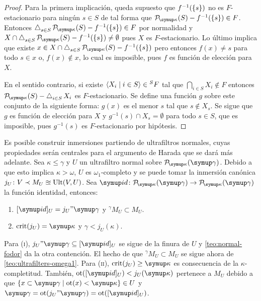 \documentclass
[
  12pt,
  letterpaper,
  openany,
  oneside,
]{book}
\begin{document}
\begin{proof}
    Para la primera implicación, queda supuesto que $f^{-1}(\left\{ s \right\})$ no es $F$-estacionario
    para ningún $s\in S$ de tal forma que $\pwset[\kappa]{S}-f^{-1}(\set{s}) \in F$.
    Entonces $\dint_{s\in S}\pwset[\kappa]{S}-f^{-1}(\set{s})\in F$ por normalidad
    y $X\cap \dint_{s\in S}\pwset[\kappa]{S}-f^{-1}(\set{s})\neq\emptyset$
    pues $X$ es $F$-estacionario. Lo último implica que existe
    $x\in X\cap \dint_{s\in S}\pwset[\kappa]{S}-f^{-1}(\set{s})$
    pero entonces $f(x)\neq s$ para todo $s\in x$ o,
    $f(x)\notin x$, lo cual es imposible, pues $f$ es función de elección para $X$.

    En el sentido contrario, si existe $\langle X_i\mid i\in S \rangle\in {}^SF$ tal que
    $\dint_{i\in S} X_i \notin F$ entonces $\pwset[\kappa]{S} - \dint_{i\in S} X_i$
    es $F$-estacionario. Se define una función $g$ sobre este conjunto de la siguiente
    forma: $g(x)$ es el menor $s$ tal que $s\notin X_s$. Se sigue que $g$ es función
    de elección para $X$ y $g^{-1}({s})\cap X_s=\emptyset$ para todo $s\in S$, que es
    imposible, pues $g^{-1}({s})$ es $F$-estacionario por hipótesis.
\end{proof}

Es posible construir inmersiones partiendo de ultrafiltros normales,
cuyas propiedades serán centrales para el argumento de Harada que se dará más adelante.
Sea $\kappa\leq\gamma$ y $U$ un ultrafiltro normal sobre $\pwset[\kappa]{\gamma}$.
Debido a que esto implica $\kappa > \omega$, $U$ es $\omega_1$-completo y se puede tomar
la inmersión canónica $j_U\colon V\prec M_U\approxeq\operatorname{Ult}(V,U)$.
Sea $\id\colon\pwset[\kappa]{\gamma}\to\pwset[\kappa]{\gamma}$ la función identidad, entonces:
\begin{enumerate}[label=(\roman*)]
    \item $[\id]_U = j_U"\gamma$ y ${}^\gamma M_U\subset M_U$.
    \item $\crit{j_U} = \kappa$ y $\gamma < j_U(\kappa)$.
\end{enumerate}

Para (\textsc{i}), $j_U"\gamma \subseteq [\id]_U$ se sigue de la finura de $U$ y
\ref{teo:normal-fodor} da la otra contención. El hecho de que ${}^\gamma M_U\subset M_U$
se sigue ahora de \ref{teo:ultrafilters-omega1}. Para (\textsc{ii}), $\crit{j_U}\geq\kappa$
es consecuencia de la $\kappa$-completitud. También, $\ot([\id]_U) < j_U(\kappa)$ pertenece
a $M_U$ debido a que $\set{x\subset\gamma\mid\ot(x)<\kappa}\in U$ y
$\gamma=\ot(j_U"\gamma)=\ot([\id]_U)$.
\end{document}
